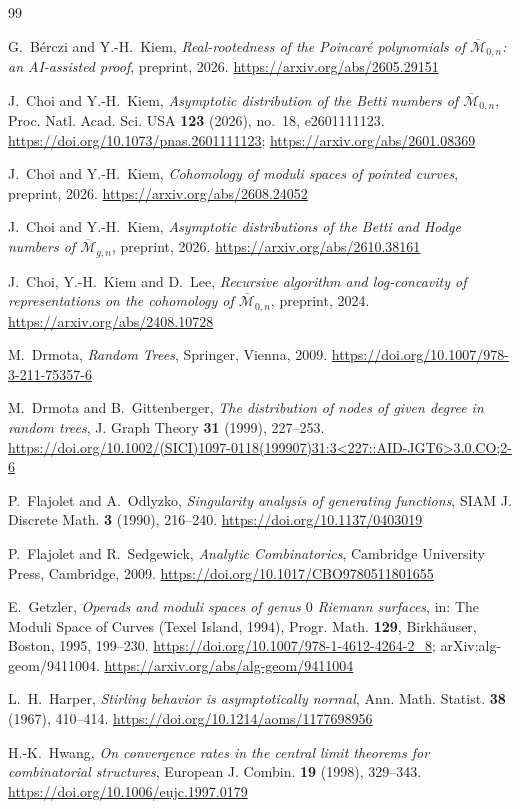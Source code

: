 \documentclass[11pt]{amsart}
\theoremstyle{definition}
\theoremstyle{remark}
\numberwithin{equation}{section}
\begin{document}
\begin{thebibliography}{99}

G.~B\'erczi and Y.-H.~Kiem, \emph{Real-rootedness of the Poincar\'e polynomials of \(\overline{\mathcal M}_{0,n}\): an AI-assisted proof}, preprint, 2026.
\url{https://arxiv.org/abs/2605.29151}

J.~Choi and Y.-H.~Kiem, \emph{Asymptotic distribution of the Betti numbers of \(\overline{\mathcal M}_{0,n}\)}, Proc. Natl. Acad. Sci. USA \textbf{123} (2026), no.~18, e2601111123.
\url{https://doi.org/10.1073/pnas.2601111123};
\url{https://arxiv.org/abs/2601.08369}

J.~Choi and Y.-H.~Kiem, \emph{Cohomology of moduli spaces of pointed curves}, preprint, 2026.
\url{https://arxiv.org/abs/2608.24052}

J.~Choi and Y.-H.~Kiem, \emph{Asymptotic distributions of the Betti and Hodge numbers of \(\overline{\mathcal M}_{g,n}\)}, preprint, 2026.
\url{https://arxiv.org/abs/2610.38161}

J.~Choi, Y.-H.~Kiem and D.~Lee, \emph{Recursive algorithm and log-concavity of representations on the cohomology of \(\overline{\mathcal M}_{0,n}\)}, preprint, 2024.
\url{https://arxiv.org/abs/2408.10728}

M.~Drmota, \emph{Random Trees}, Springer, Vienna, 2009.
\url{https://doi.org/10.1007/978-3-211-75357-6}

M.~Drmota and B.~Gittenberger, \emph{The distribution of nodes of given degree in random trees}, J. Graph Theory \textbf{31} (1999), 227--253.
\url{https://doi.org/10.1002/(SICI)1097-0118(199907)31:3<227::AID-JGT6>3.0.CO;2-6}

P.~Flajolet and A.~Odlyzko, \emph{Singularity analysis of generating functions}, SIAM J. Discrete Math. \textbf{3} (1990), 216--240.
\url{https://doi.org/10.1137/0403019}

P.~Flajolet and R.~Sedgewick, \emph{Analytic Combinatorics}, Cambridge University Press, Cambridge, 2009.
\url{https://doi.org/10.1017/CBO9780511801655}

E.~Getzler, \emph{Operads and moduli spaces of genus \(0\) Riemann surfaces}, in: The Moduli Space of Curves (Texel Island, 1994), Progr. Math. \textbf{129}, Birkh\"auser, Boston, 1995, 199--230. \url{https://doi.org/10.1007/978-1-4612-4264-2_8}; arXiv:alg-geom/9411004.
\url{https://arxiv.org/abs/alg-geom/9411004}

L.~H.~Harper, \emph{Stirling behavior is asymptotically normal}, Ann. Math. Statist. \textbf{38} (1967), 410--414.
\url{https://doi.org/10.1214/aoms/1177698956}

H.-K.~Hwang, \emph{On convergence rates in the central limit theorems for combinatorial structures}, European J. Combin. \textbf{19} (1998), 329--343.
\url{https://doi.org/10.1006/eujc.1997.0179}

\end{thebibliography}
\end{document}
